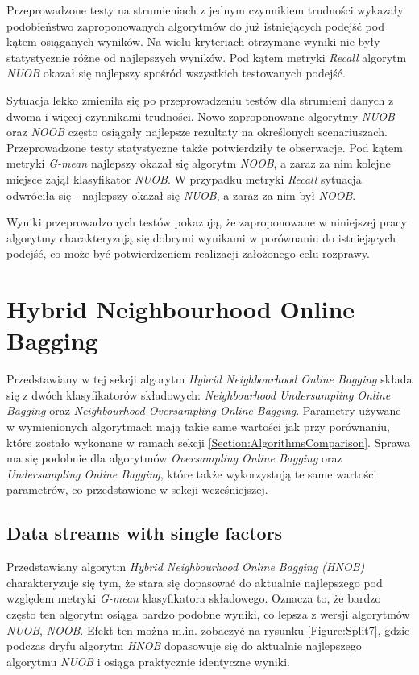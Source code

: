 Przeprowadzone testy na strumieniach z jednym czynnikiem trudności wykazały podobieństwo zaproponowanych algorytmów do już istniejących podejść pod kątem osiąganych wyników. Na wielu kryteriach otrzymane wyniki nie były statystycznie różne od najlepszych wyników. Pod kątem metryki \textit{Recall} algorytm \textit{NUOB} okazał się najlepszy spośród wszystkich testowanych podejść.

Sytuacja lekko zmieniła się po przeprowadzeniu testów dla strumieni danych z dwoma i więcej czynnikami trudności. Nowo zaproponowane algorytmy \textit{NUOB} oraz \textit{NOOB} często osiągały najlepsze rezultaty na określonych scenariuszach. Przeprowadzone testy statystyczne także potwierdziły te obserwacje. Pod kątem metryki \textit{G-mean} najlepszy okazał się algorytm \textit{NOOB}, a zaraz za nim kolejne miejsce zajął klasyfikator \textit{NUOB}. W przypadku metryki \textit{Recall} sytuacja odwróciła się - najlepszy okazał się \textit{NUOB}, a zaraz za nim był \textit{NOOB}.

Wyniki przeprowadzonych testów pokazują, że zaproponowane w niniejszej pracy algorytmy charakteryzują się dobrymi wynikami w porównaniu do istniejących podejść, co może być potwierdzeniem realizacji założonego celu rozprawy.

\section{Hybrid Neighbourhood Online Bagging}

\noindent Przedstawiany w tej sekcji algorytm \textit{Hybrid Neighbourhood Online Bagging} składa się z dwóch klasyfikatorów składowych: \textit{Neighbourhood Undersampling Online Bagging} oraz \textit{Neighbourhood Oversampling Online Bagging}. Parametry używane w wymienionych algorytmach mają takie same wartości jak przy porównaniu, które zostało wykonane w ramach sekcji \ref{Section:AlgorithmsComparison}. Sprawa ma się podobnie dla algorytmów \textit{Oversampling Online Bagging} oraz \textit{Undersampling Online Bagging}, które także wykorzystują te same wartości parametrów, co przedstawione w sekcji wcześniejszej.

\subsection{Data streams with single factors}

\noindent Przedstawiany algorytm \textit{Hybrid Neighbourhood Online Bagging (HNOB)} charakteryzuje się tym, że stara się dopasować do aktualnie najlepszego pod względem metryki \textit{G-mean} klasyfikatora składowego. Oznacza to, że bardzo często ten algorytm osiąga bardzo podobne wyniki, co lepsza z wersji algorytmów \textit{NUOB}, \textit{NOOB}. Efekt ten można m.in. zobaczyć na rysunku \ref{Figure:Split7}, gdzie podczas dryfu algorytm \textit{HNOB} dopasowuje się do aktualnie najlepszego algorytmu \textit{NUOB} i osiąga praktycznie identyczne wyniki.

